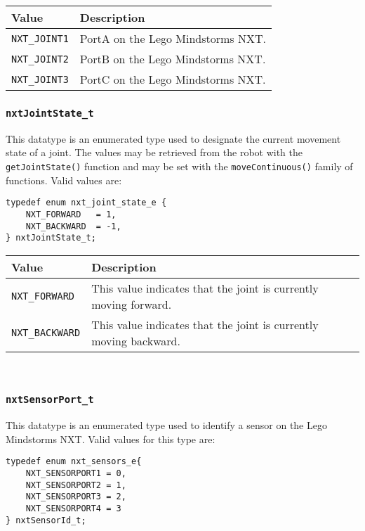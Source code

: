 \noindent
\begin{tabular}{p{3.5cm}p{12cm}} \hline 
Value & Description \\
\hline 
\texttt{NXT\_JOINT1} & PortA on the Lego Mindstorms NXT. \\
\texttt{NXT\_JOINT2} & PortB on the Lego Mindstorms NXT. \\
\texttt{NXT\_JOINT3} & PortC on the Lego Mindstorms NXT. \\
\hline
\end{tabular}

\subsubsection{\label{sec:nxtJointState_t}\texttt{nxtJointState\_t}}
This datatype is an enumerated type used to designate the current 
movement state of a joint. The values may be retrieved from the 
robot with the \texttt{getJointState()} function and may be set 
with the \texttt{moveContinuous()} family of functions. Valid values are:

\begin{verbatim}
typedef enum nxt_joint_state_e {
    NXT_FORWARD   = 1,
    NXT_BACKWARD  = -1,
} nxtJointState_t;
\end{verbatim}



\noindent
\begin{tabular}{p{3.5cm}p{12cm}} \hline 
Value & Description \\
\hline
\texttt{NXT\_FORWARD} & This value indicates that the joint is currently moving forward.  \\
\texttt{NXT\_BACKWARD}& This value indicates that the joint is currently moving backward. \\
\hline
\end{tabular}
\\

\subsubsection{\label{sec:nxtSensorPort_t}\texttt{nxtSensorPort\_t}}
This datatype is an enumerated type used to identify a sensor on 
the Lego Mindstorms NXT. Valid values for this type are:

\begin{verbatim}
typedef enum nxt_sensors_e{
    NXT_SENSORPORT1 = 0,
    NXT_SENSORPORT2 = 1,
    NXT_SENSORPORT3 = 2,
    NXT_SENSORPORT4 = 3
} nxtSensorId_t;
\end{verbatim}

